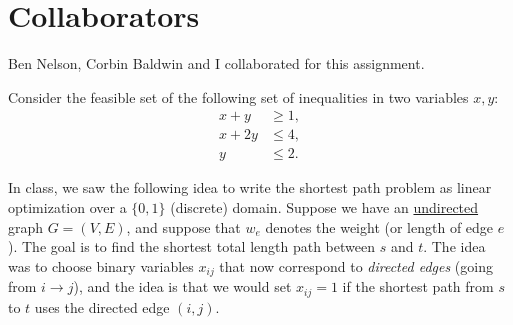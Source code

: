 \documentclass[addpoints]{exam}
\begin{document}
\section*{Collaborators}

Ben Nelson, Corbin Baldwin and I collaborated for this assignment.

\begin{questions}

Consider the feasible set of the following set of inequalities in two variables $x, y$:
\begin{align*}
x + y &\ge 1, \\
x + 2y &\le 4, \\
y &\le 2.
\end{align*}

In class, we saw the following idea to write the shortest path problem as linear optimization over a $\{0,1\}$ (discrete) domain.  Suppose we have an \underline{undirected} graph $G = (V, E)$, and suppose that $w_e$ denotes the weight (or length of edge $e$).  The goal is to find the shortest total length path between $s$ and $t$.   The idea was to choose binary variables $x_{ij}$ that now correspond to {\em directed edges} (going from $i \rightarrow j$), and the idea is that we would set $x_{ij}=1$ if the shortest path from $s$ to $t$ uses the directed edge $(i,j)$.  


\end{questions}
\end{document}
